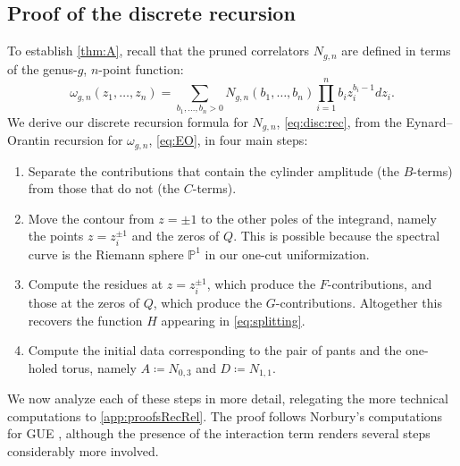 \documentclass[a4paper,11pt,english]{article}
\theoremstyle{plain}
\theoremstyle{definition}
\theoremstyle{plain}
\begin{document}
\subsection{Proof of the discrete recursion}
\label{ssec:disc:rec:proof}
To establish \cref{thm:A}, recall that the pruned correlators $N_{g,n}$ are defined in terms of the genus-$g$, $n$-point function:
\begin{equation}
    \omega_{g,n}(z_1,\dots,z_n)
    =
    \sum_{b_1,\dots,b_n >0}
        N_{g,n}(b_1,\dots,b_n) \prod_{i=1}^n b_i z_i^{b_i-1} dz_i.
\end{equation}
We derive our discrete recursion formula for $N_{g,n}$, \cref{eq:disc:rec}, from the Eynard--Orantin recursion for $\omega_{g,n}$, \cref{eq:EO}, in four main steps:
\begin{enumerate}[label=\Roman*)]
	\item Separate the contributions that contain the cylinder amplitude (the $B$-terms) from those that do not (the $C$-terms).
	
	\item Move the contour from $z=\pm 1$ to the other poles of the integrand, namely the points $z=z_i^{\pm 1}$ and the zeros of $Q$. This is possible because the spectral curve is the Riemann sphere $\mathbb{P}^1$ in our one-cut uniformization.
	
	\item Compute the residues at $z=z_i^{\pm 1}$, which produce the $F$-contributions, and those at the zeros of $Q$, which produce the $G$-contributions. Altogether this recovers the function $H$ appearing in \cref{eq:splitting}.
	
	\item Compute the initial data corresponding to the pair of pants and the one-holed torus, namely $A \coloneqq N_{0,3}$ and $D \coloneqq N_{1,1}$.
\end{enumerate}
We now analyze each of these steps in more detail, relegating the more technical computations to \cref{app:proofsRecRel}. The proof follows Norbury's computations for GUE \cite{Nor13}, although the presence of the interaction term renders several steps considerably more involved.
\end{document}
